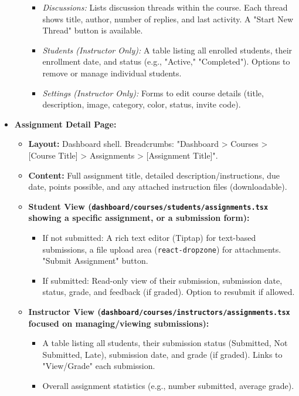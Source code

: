 \begin{itemize}
\begin{itemize}
\begin{itemize}
            \item \textit{Discussions:} Lists discussion threads within the course. Each thread shows title, author, number of replies, and last activity. A "Start New Thread" button is available.
            \item \textit{Students (Instructor Only):} A table listing all enrolled students, their enrollment date, and status (e.g., "Active," "Completed"). Options to remove or manage individual students.
            \item \textit{Settings (Instructor Only):} Forms to edit course details (title, description, image, category, color, status, invite code).
        \end{itemize}
    \end{itemize}
    \item \textbf{Assignment Detail Page:}
    \begin{itemize}
        \item \textbf{Layout:} Dashboard shell. Breadcrumbs: "Dashboard > Courses > [Course Title] > Assignments > [Assignment Title]".
        \item \textbf{Content:} Full assignment title, detailed description/instructions, due date, points possible, and any attached instruction files (downloadable).
        \item \textbf{Student View (\texttt{dashboard/courses/students/assignments.tsx} showing a specific assignment, or a submission form):}
        \begin{itemize}
            \item If not submitted: A rich text editor (Tiptap) for text-based submissions, a file upload area (\texttt{react-dropzone}) for attachments. "Submit Assignment" button.
            \item If submitted: Read-only view of their submission, submission date, status, grade, and feedback (if graded). Option to resubmit if allowed.
        \end{itemize}
        \item \textbf{Instructor View (\texttt{dashboard/courses/instructors/assignments.tsx} focused on managing/viewing submissions):}
        \begin{itemize}
            \item A table listing all students, their submission status (Submitted, Not Submitted, Late), submission date, and grade (if graded). Links to "View/Grade" each submission.
            \item Overall assignment statistics (e.g., number submitted, average grade).

\end{itemize}
\end{itemize}
\end{itemize}
